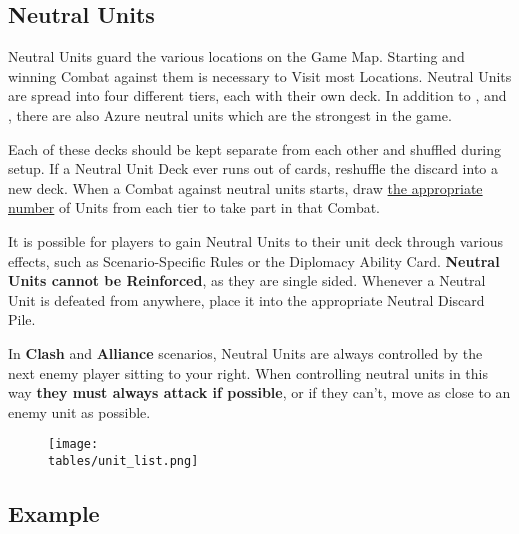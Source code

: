 \begin{multicols}{2}
\subsection*{Neutral Units}
Neutral Units guard the various locations on the Game Map.
Starting and winning Combat against them is necessary to Visit most Locations.
Neutral Units are spread into four different tiers, each with their own deck.
In addition to ,  and , there are also Azure  neutral units which are the strongest in the game.\par
Each of these decks should be kept separate from each other and shuffled during setup.
If a Neutral Unit Deck ever runs out of cards, reshuffle the discard into a new deck.
When a Combat against neutral units starts, draw \hyperlink{Difficulty}{the appropriate number} of Units from each tier to take part in that Combat.\par
It is possible for players to gain Neutral Units to their unit deck through various effects, such as Scenario-Specific Rules or the Diplomacy Ability Card.
\textbf{Neutral Units cannot be Reinforced}, as they are single sided.
Whenever a Neutral Unit is defeated from anywhere, place it into the appropriate Neutral Discard Pile.\par
In \textbf{Clash} and \textbf{Alliance} scenarios, Neutral Units are always controlled by the next enemy player sitting to your right.
When controlling neutral units in this way \textbf{they must always attack if possible}, or if they can't, move as close to an enemy unit as possible.\par

\end{multicols}

\begin{figure*}[!hb]
  \centering
  \texttt{[image: \\tables/unit\_list.png]}
\end{figure*}

\clearpage

\subsection*{Example}


